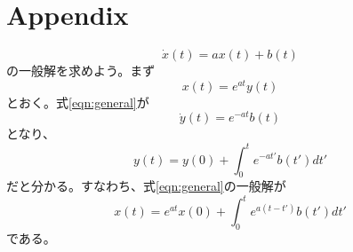 \documentclass[10pt]{article}
\begin{document}
\section{Appendix}
\begin{equation}\label{eqn:general}
    \dot{x}(t)=ax(t)+b(t)
\end{equation}
の一般解を求めよう。まず
\begin{equation}
    x(t)=e^{at}y(t)
\end{equation}
とおく。式\ref{eqn:general}が
\begin{equation}
    \dot{y}(t)=e^{-at}b(t)
\end{equation}
となり、
\begin{equation}
    y(t)=y(0)+\int_{0}^{t}e^{-at'}b(t')dt'
\end{equation}
だと分かる。すなわち、式\ref{eqn:general}の一般解が
\begin{equation}\label{eqn:solution}
    x(t)=e^{at}x(0)+\int_{0}^{t}e^{a(t-t')}b(t')dt'
\end{equation}
である。
\end{document}
